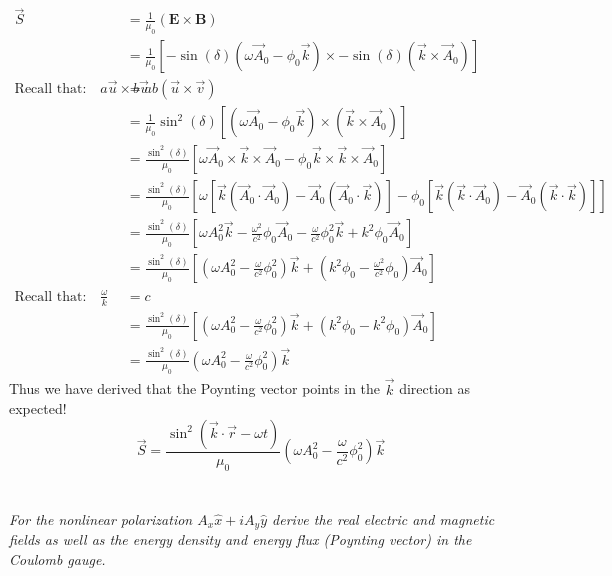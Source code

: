 \documentclass[a4paper, 11pt]{article}
\begin{document}
	\begin{align*}
		\vec{S} &= \frac{1}{\mu_0}(\mathbf{E} \times \mathbf{B}) \\ 
				&= \frac{1}{\mu_0}[-\sin(\delta)(\omega\vec{A}_0-\phi_0\vec{k})\times -\sin(\delta)(\vec{k}\times\vec{A}_0)] \\ 
		\text{Recall that:} \quad a\vec{u}\times b\vec{v} &= ab(\vec{u}\times\vec{v}) \\ 
				&= \frac{1}{\mu_0}\sin^2(\delta)[(\omega\vec{A}_0-\phi_0\vec{k})\times(\vec{k}\times\vec{A}_0)] \\ 
				&= \frac{\sin^2(\delta)}{\mu_0}[\omega\vec{A}_0\times\vec{k}\times\vec{A}_0 - \phi_0\vec{k}\times\vec{k}\times\vec{A}_0] \\ 
				&= \frac{\sin^2(\delta)}{\mu_0}[\omega[\vec{k}(\vec{A}_0\cdot\vec{A}_0)-\vec{A}_0(\vec{A}_0\cdot\vec{k})]-\phi_0[\vec{k}(\vec{k}\cdot\vec{A}_0)-\vec{A}_0(\vec{k}\cdot\vec{k})]]\\
				&= \frac{\sin^2(\delta)}{\mu_0}[\omega A_0^2\vec{k}-\frac{\omega^2}{c^2}\phi_0\vec{A}_0-\frac{\omega}{c^2}\phi_0^2\vec{k}+k^2\phi_0\vec{A}_0]\\
				&=\frac{\sin^2(\delta)}{\mu_0}[(\omega A_0^2-\frac{\omega}{c^2}\phi_0^2)\vec{k}+(k^2\phi_0-\frac{\omega^2}{c^2}\phi_0)\vec{A}_0]\\
		\text{Recall that:} \quad \frac{\omega}{k} &= c \\ 
				&= \frac{\sin^2(\delta)}{\mu_0}[(\omega A_0^2-\frac{\omega}{c^2}\phi_0^2)\vec{k}+(k^2\phi_0-k^2\phi_0)\vec{A}_0]\\
				&= \frac{\sin^2(\delta)}{\mu_0}(\omega A_0^2-\frac{\omega}{c^2}\phi_0^2)\vec{k}
	\end{align*}
Thus we have derived that the Poynting vector points in the $\vec{k}$ direction as expected!
	\begin{equation}
		\vec{S} = \frac{\sin^2(\vec{k}\cdot\vec{r}-\omega t)}{\mu_0}(\omega A_0^2-\frac{\omega}{c^2}\phi_0^2)\vec{k} 
	\end{equation}
	
\section{}
\textit{For the nonlinear polarization $A_x\hat{x}+iA_y\hat{y}$ derive the real electric and magnetic fields as well as the energy density and energy flux (Poynting vector) in the Coulomb gauge.} \\ 
	
\end{document}
